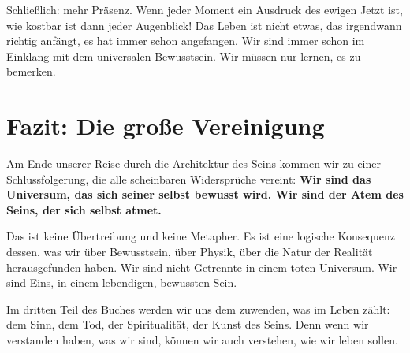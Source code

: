 Schließlich: mehr Präsenz. Wenn jeder Moment ein Ausdruck des ewigen Jetzt ist, wie kostbar ist dann jeder Augenblick! Das Leben ist nicht etwas, das irgendwann \glqq richtig\grqq{} anfängt, es hat immer schon angefangen. Wir sind immer schon im Einklang mit dem universalen Bewusstsein. Wir müssen nur lernen, es zu bemerken.

\section{Fazit: Die große Vereinigung}

Am Ende unserer Reise durch die Architektur des Seins kommen wir zu einer Schlussfolgerung, die alle scheinbaren Widersprüche vereint: \textbf{Wir sind das Universum, das sich seiner selbst bewusst wird. Wir sind der Atem des Seins, der sich selbst atmet.}

Das ist keine Übertreibung und keine Metapher. Es ist eine logische Konsequenz dessen, was wir über Bewusstsein, über Physik, über die Natur der Realität herausgefunden haben. Wir sind nicht Getrennte in einem toten Universum. Wir sind Eins, in einem lebendigen, bewussten Sein.

Im dritten Teil des Buches werden wir uns dem zuwenden, was im Leben zählt: dem Sinn, dem Tod, der Spiritualität, der Kunst des Seins. Denn wenn wir verstanden haben, was wir sind, können wir auch verstehen, wie wir leben sollen.
